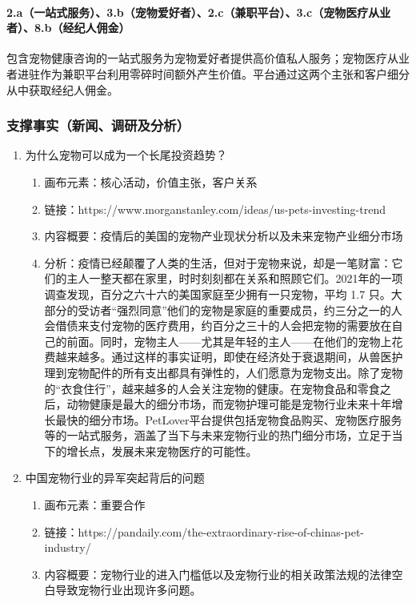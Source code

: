 \documentclass[a4paper]{ctexart}
\begin{document}
\paragraph{2.a（一站式服务）、3.b（宠物爱好者）、2.c（兼职平台）、3.c（宠物医疗从业者）、8.b（经纪人佣金）}包含宠物健康咨询的一站式服务为宠物爱好者提供高价值私人服务；宠物医疗从业者进驻作为兼职平台利用零碎时间额外产生价值。平台通过这两个主张和客户细分从中获取经纪人佣金。

\subsubsection{支撑事实（新闻、调研及分析）}


\begin{enumerate}[label=\alph*.]
  \item 为什么宠物可以成为一个长尾投资趋势？
  \begin{enumerate}[label=\alph*.]
    \item 画布元素：核心活动，价值主张，客户关系
    \item 链接：https://www.morganstanley.com/ideas/us-pets-investing-trend
    \item 内容概要：疫情后的美国的宠物产业现状分析以及未来宠物产业细分市场
    \item 分析：疫情已经颠覆了人类的生活，但对于宠物来说，却是一笔财富：它们的主人一整天都在家里，时时刻刻都在关系和照顾它们。2021年的一项调查发现，百分之六十六的美国家庭至少拥有一只宠物，平均 1.7 只。大部分的受访者“强烈同意”他们的宠物是家庭的重要成员，约三分之一的人会借债来支付宠物的医疗费用，约百分之三十的人会把宠物的需要放在自己的前面。同时，宠物主人——尤其是年轻的主人——在他们的宠物上花费越来越多。通过这样的事实证明，即使在经济处于衰退期间，从兽医护理到宠物配件的所有支出都具有弹性的，人们愿意为宠物支出。除了宠物的“衣食住行”，越来越多的人会关注宠物的健康。在宠物食品和零食之后，动物健康是最大的细分市场，而宠物护理可能是宠物行业未来十年增长最快的细分市场。PetLover平台提供包括宠物食品购买、宠物医疗服务等的一站式服务，涵盖了当下与未来宠物行业的热门细分市场，立足于当下的增长点，发展未来宠物医疗的可能性。
  \end{enumerate}
  \item 中国宠物行业的异军突起背后的问题
  \begin{enumerate}[label=\alph*.]
    \item 画布元素：重要合作
    \item 链接：https://pandaily.com/the-extraordinary-rise-of-chinas-pet-industry/
    \item 内容概要：宠物行业的进入门槛低以及宠物行业的相关政策法规的法律空白导致宠物行业出现许多问题。

\end{enumerate}
\end{enumerate}
\end{document}
